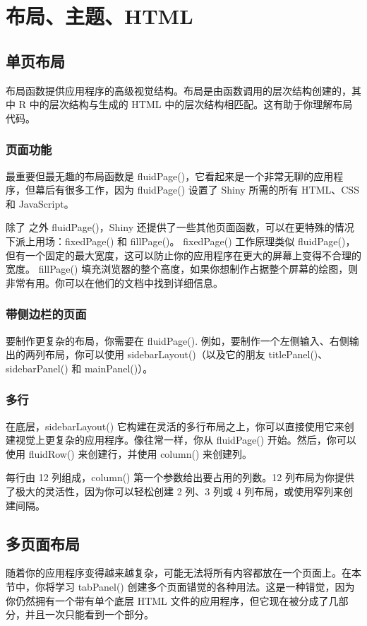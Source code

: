 \chapter{布局、主题、HTML\label{ch06}}
\section{单页布局}
布局函数提供应用程序的高级视觉结构。布局是由函数调用的层次结构创建的，其中 R 中的层次结构与生成的 HTML 中的层次结构相匹配。这有助于你理解布局代码。
\subsection{页面功能}
最重要但最无趣的布局函数是 fluidPage()，它看起来是一个非常无聊的应用程序，但幕后有很多工作，因为 fluidPage() 设置了 Shiny 所需的所有 HTML、CSS 和 JavaScript。

除了 之外 fluidPage()，Shiny 还提供了一些其他页面函数，可以在更特殊的情况下派上用场：fixedPage() 和 fillPage()。 fixedPage() 工作原理类似 fluidPage()，但有一个固定的最大宽度，这可以防止你的应用程序在更大的屏幕上变得不合理的宽度。 fillPage() 填充浏览器的整个高度，如果你想制作占据整个屏幕的绘图，则非常有用。你可以在他们的文档中找到详细信息。
\subsection{带侧边栏的页面}
要制作更复杂的布局，你需要在 fluidPage(). 例如，要制作一个左侧输入、右侧输出的两列布局，你可以使用 sidebarLayout()（以及它的朋友 titlePanel()、sidebarPanel() 和 mainPanel()）。


\subsection{多行}
在底层，sidebarLayout() 它构建在灵活的多行布局之上，你可以直接使用它来创建视觉上更复杂的应用程序。像往常一样，你从 fluidPage() 开始。然后，你可以使用 fluidRow() 来创建行，并使用 column() 来创建列。

每行由 12 列组成，column() 第一个参数给出要占用的列数。12 列布局为你提供了极大的灵活性，因为你可以轻松创建 2 列、3 列或 4 列布局，或使用窄列来创建间隔。
\section{多页面布局}
随着你的应用程序变得越来越复杂，可能无法将所有内容都放在一个页面上。在本节中，你将学习 tabPanel() 创建多个页面错觉的各种用法。这是一种错觉，因为你仍然拥有一个带有单个底层 HTML 文件的应用程序，但它现在被分成了几部分，并且一次只能看到一个部分。

